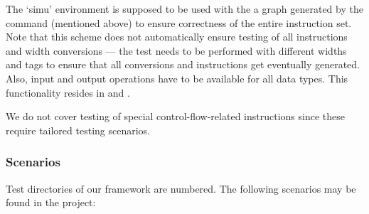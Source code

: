The `simu' environment is supposed to be used with the a graph generated by the  command (mentioned above) to ensure correctness of the entire instruction set. Note that this scheme does not automatically ensure testing of all instructions and width conversions --- the test needs to be performed with different widths and tags to ensure that all conversions and instructions get eventually generated. Also, input and output operations have to be available for all data types. This functionality resides in  and . 

We do not cover testing of special control-flow-related instructions since these require tailored testing scenarios.


\subsubsection{Scenarios}

Test directories of our framework are numbered. The following scenarios may be found in the project:

